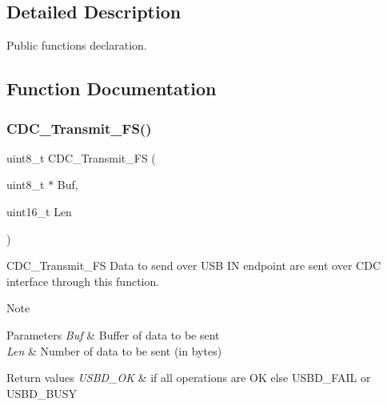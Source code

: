 \subsection{Detailed Description}
Public functions declaration. 



\subsection{Function Documentation}
\mbox{\label{group__USBD__CDC__IF__Exported__FunctionsPrototype_ga5137d6201dbdef2bf351c5b4941c24f4}} 
\subsubsection{\texorpdfstring{C\+D\+C\+\_\+\+Transmit\+\_\+\+F\+S()}{CDC\_Transmit\_FS()}}
{\footnotesize\ttfamily uint8\+\_\+t C\+D\+C\+\_\+\+Transmit\+\_\+\+FS (\begin{DoxyParamCaption}\item[{uint8\+\_\+t $\ast$}]{Buf,  }\item[{uint16\+\_\+t}]{Len }\end{DoxyParamCaption})}



C\+D\+C\+\_\+\+Transmit\+\_\+\+FS Data to send over U\+SB IN endpoint are sent over C\+DC interface through this function. 

\begin{DoxyNote}{Note}

\end{DoxyNote}

\begin{DoxyParams}{Parameters}
{\em Buf} & Buffer of data to be sent \\
\hline
{\em Len} & Number of data to be sent (in bytes) \\
\hline
\end{DoxyParams}

\begin{DoxyRetVals}{Return values}
{\em U\+S\+B\+D\+\_\+\+OK} & if all operations are OK else U\+S\+B\+D\+\_\+\+F\+A\+IL or U\+S\+B\+D\+\_\+\+B\+U\+SY \\
\hline
\end{DoxyRetVals}
